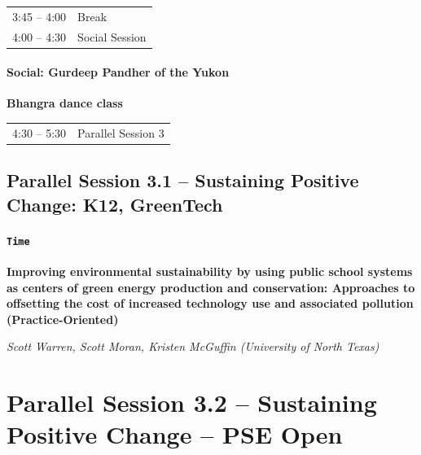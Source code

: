 \documentclass[
]{book}
\begin{document}
\begin{longtable}[]{@{}ll@{}}
\toprule
& \\
\midrule
\endhead
3:45 -- 4:00 & Break \\
4:00 -- 4:30 & Social Session \\
\bottomrule
\end{longtable}

\begin{gh}
\hypertarget{social-gurdeep-pandher-of-the-yukon}{%
\paragraph*{Social: Gurdeep Pandher of the
Yukon}\label{social-gurdeep-pandher-of-the-yukon}}

\textbf{Bhangra dance class}

\begin{longtable}[]{@{}ll@{}}
\toprule
& \\
\midrule
\endhead
4:30 -- 5:30 & Parallel Session 3 \\
\bottomrule
\end{longtable}

\hypertarget{parallel-session-3.1-sustaining-positive-change-k12-greentech}{%
\subsection*{Parallel Session 3.1 -- Sustaining Positive Change: K12,
GreenTech}\label{parallel-session-3.1-sustaining-positive-change-k12-greentech}}
\end{gh}
\begin{secondary}
\hypertarget{time}{%
\paragraph{\texorpdfstring{\texttt{Time}}{Time}}\label{time}}

\textbf{Improving environmental sustainability by using public school
systems as centers of green energy production and conservation:
Approaches to offsetting the cost of increased technology use and
associated pollution (Practice-Oriented)}

\emph{Scott Warren, Scott Moran, Kristen McGuffin (University of North
Texas)}
\end{secondary}

\hypertarget{parallel-session-3.2-sustaining-positive-change-pse-open}{%
\section*{Parallel Session 3.2 -- Sustaining Positive Change -- PSE Open}\label{parallel-session-3.2-sustaining-positive-change-pse-open}}
\end{document}
